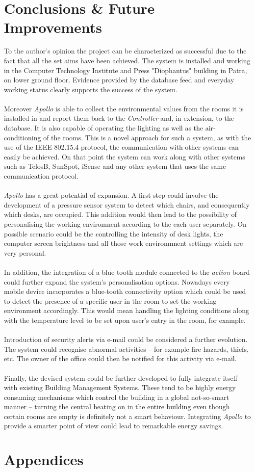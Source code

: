 \documentclass[12pt,a4paper]{report}
\begin{document}
\chapter{Conclusions \& Future Improvements}
%
To the author's opinion the project can be characterized as successful due to the fact that all the set aims have been achieved.
The system is installed and working in the Computer Technology Institute and Press "Diophantus" building in Patra,  on lower ground floor.
Evidence provided by the database feed and everyday working status clearly supports the success of the system.\\
\ \\
Moreover \emph{Apollo} is able to collect the environmental values from the rooms it is installed in and report them back to the \textit{Controller} and, in extension, to the database.
It is also capable of operating the lighting as well as the air-conditioning of the rooms.
This is a novel approach for such a system, as with the use of the IEEE 802.15.4 protocol, the communication with other systems can easily be achieved.
On that point the system can work along with other systems such as TelosB, SunSpot, iSense and any other system that uses the same communication protocol. \\
\ \\
\emph{Apollo} has a great potential of expansion.
A first step could involve the development of a pressure sensor system to detect which chairs, and consequently which desks, are occupied.
This addition would then lead to the possibility of personalising the working enviromnent according to the each user separately.
On possible scenario could be the controlling the intensity of desk lights, the computer screen brightness and all those work environmnent settings which are very personal. \\
\ \\
In addition, the integration of a blue-tooth module connected to the \textit{action} board could further expand the system's personalisation options.
Nowadays every mobile device incorporates a blue-tooth connectivity option which could be used to detect the presence of a specific user in the room to set the working environment accordingly.
This would mean handling the lighting conditions along with the temperature level to be set upon user's entry in the room, for example. \\
\ \\
Introduction of security alerts via e-mail could be considered a further evolution.
The system could recognise abnormal activities -- for example fire hazards, thiefs, etc.
The owner of the office could then be notified for this activity via e-mail.\\
\ \\
Finally, the devised system could be further developed to fully integrate itself with existing Building Management Systems.
These tend to be highly energy consuming mechanisms which control the building in a global not-so-smart manner -- turning the central heating on in the entire building even though certain rooms are empty is definitely not a smart behaviour.
Integrating \emph{Apollo} to provide a smarter point of view could lead to remarkable energy savings.
%
\newpage
%


%
\newpage
%
\chapter*{Appendices}
%
\end{document}
